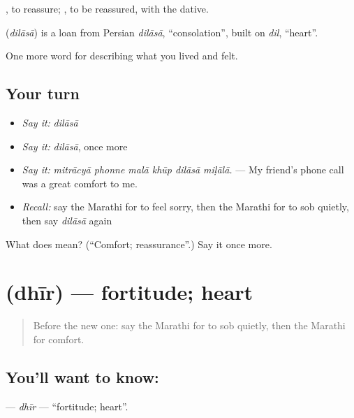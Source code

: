  , to reassure;  , to be reassured, with the dative.

\begin{cousinweb}
\textbf{} (\emph{dilāsā}) is a loan from Persian \emph{dilāsā}, \textquotedblleft{}consolation\textquotedblright{}, built on \emph{dil}, \textquotedblleft{}heart\textquotedblright{}.
\end{cousinweb}

\begin{grammarlens}[title={What you've built}]
One more word for describing what you lived and felt.
\end{grammarlens}

\subsection*{Your turn}
\begin{itemize}
\raggedright
  \item \emph{Say it:} \emph{dilāsā}
  \item \emph{Say it:} \emph{dilāsā}, once more
  \item \emph{Say it:} \emph{mitrācyā phonne malā khūp dilāsā miḷālā.} — My friend's phone call was a great comfort to me.
  \item \emph{Recall:} say the Marathi for to feel sorry, then the Marathi for to sob quietly, then say \emph{dilāsā} again
\end{itemize}

\begin{tcolorbox}[breakable,colback=teal!4,colframe=teal!35!black,title={Before you move on}]
What does  mean? (\textquotedblleft{}Comfort; reassurance\textquotedblright{}.) Say it once more.
\end{tcolorbox}
\section[\texorpdfstring{\mr{धीर} (dhīr)}{धीर (dhīr)}]{ (dhīr) — fortitude; heart}

\label{lesson:MR-C458-dhir}



\begin{quote}
Before the new one: say the Marathi for to sob quietly, then the Marathi for comfort.
\end{quote}

\subsection*{You'll want to know: }
\textbf{} — \emph{dhīr} — \textquotedblleft{}fortitude; heart\textquotedblright{}.

